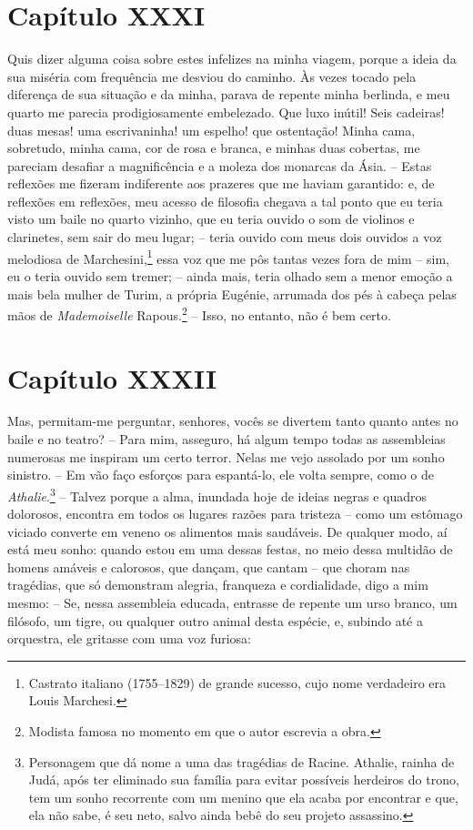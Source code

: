 \section{Capítulo XXXI}

 Quis dizer alguma coisa sobre estes infelizes na minha viagem, porque a
ideia da sua miséria com frequência me desviou do caminho. Às vezes
tocado pela diferença de sua situação e da minha, parava de repente
minha berlinda, e meu quarto me parecia prodigiosamente embelezado. Que
luxo inútil! Seis cadeiras! duas mesas! uma escrivaninha! um espelho!
que ostentação! Minha cama, sobretudo, minha cama, cor de rosa e
branca, e minhas duas cobertas, me pareciam desafiar a magnificência e
a moleza dos monarcas da Ásia. -- Estas reflexões me fizeram
indiferente aos prazeres que me haviam garantido: e, de reflexões em
reflexões, meu acesso de filosofia chegava a tal ponto que eu teria
visto um baile no quarto vizinho, que eu teria ouvido o som de violinos
e clarinetes, sem sair do meu lugar; -- teria ouvido com meus dois
ouvidos a voz melodiosa de Marchesini,\footnote{ Castrato italiano
(1755--1829) de grande sucesso, cujo nome verdadeiro era Louis Marchesi.}
essa voz que me pôs tantas vezes fora de mim -- sim, eu o
teria ouvido sem tremer; -- ainda mais, teria olhado sem a menor
emoção a mais bela mulher de Turim, a própria Eugénie, arrumada dos pés
à cabeça pelas mãos de \textit{Mademoiselle} Rapous.\footnote{ Modista
famosa no momento em que o autor escrevia a obra.} -- Isso, no
entanto, não é bem certo. 

\section{Capítulo XXXII}

 Mas, permitam-me perguntar, senhores, vocês se divertem tanto quanto
antes no baile e no teatro? -- Para mim, asseguro, há algum tempo
todas as assembleias numerosas me inspiram um certo terror. Nelas me
vejo assolado por um sonho sinistro. -- Em vão faço esforços para
espantá-lo, ele volta sempre, como o de \textit{Athalie}.\footnote{
Personagem que dá nome a uma das tragédias de Racine. Athalie, rainha
de Judá, após ter eliminado sua família para evitar possíveis herdeiros
do trono, tem um sonho recorrente com um menino que ela acaba por
encontrar e que, ela não sabe, é seu neto, salvo ainda bebê do seu
projeto assassino.} -- Talvez porque a alma, inundada hoje de
ideias negras e quadros dolorosos, encontra em todos os lugares razões
para tristeza -- como um estômago viciado converte em veneno os
alimentos mais saudáveis. De qualquer modo, aí está meu sonho: quando
estou em uma dessas festas, no meio dessa multidão de homens amáveis e
calorosos, que dançam, que cantam -- que choram nas tragédias, que só
demonstram alegria, franqueza e cordialidade, digo a mim mesmo: -- Se,
nessa assembleia educada, entrasse de repente um urso branco, um
filósofo, um tigre, ou qualquer outro animal desta espécie, e, subindo
até a orquestra, ele gritasse com uma voz furiosa:

